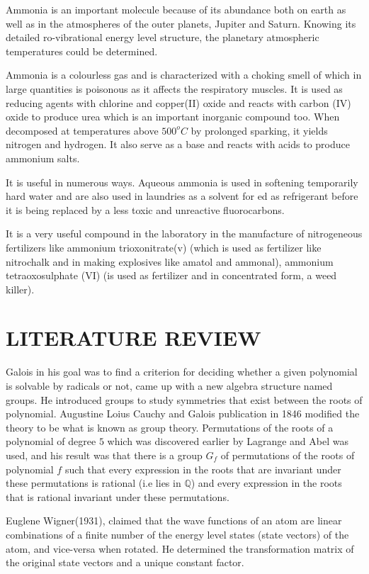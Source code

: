 \documentclass[a4paper, 12pt, openany]{report}
\begin{document}
	Ammonia is an important molecule because of its abundance both on earth as well as in the atmospheres of the outer planets, Jupiter and Saturn. Knowing its detailed ro-vibrational energy level structure, the  planetary  atmospheric temperatures could be determined.
	
	Ammonia is a colourless gas and is characterized with a choking smell of which in large quantities is poisonous as it affects the respiratory muscles. It is used as reducing agents with chlorine and copper(II) oxide and reacts with   carbon (IV) oxide to produce urea which is an important inorganic compound too. When decomposed at temperatures above $500^oC$  by prolonged sparking, it yields nitrogen and hydrogen. It also serve as a base and reacts with acids to produce ammonium salts.
	
	It is useful in numerous ways. Aqueous ammonia is used in softening temporarily hard water and are also used in laundries as a solvent for ed as refrigerant before it is being replaced by a less toxic and unreactive fluorocarbons.
	
	It is a very useful compound in the laboratory in the  manufacture of nitrogeneous fertilizers like ammonium trioxonitrate(v) (which is used as  fertilizer like nitrochalk and in making explosives like amatol and ammonal), ammonium tetraoxosulphate (VI) (is used as fertilizer and in concentrated form, a weed killer).
	
	\chapter{LITERATURE REVIEW} 
	 Galois in his goal was to find a criterion for deciding whether a given \break polynomial is solvable by radicals or not, came up with a new algebra \break structure named groups. He introduced groups to study symmetries that \break exist between the roots of polynomial. Augustine Loius Cauchy and \break Galois publication in 1846 modified the theory to be what is known as group theory. Permutations of the roots of a polynomial of degree $5$ which was \break discovered earlier by Lagrange and Abel was used, and his result was that there is a group $G_f$ of permutations of the roots of polynomial $f$ such that every expression in the roots that are invariant under these permutations is \break rational (i.e lies in $\mathbb{Q}$) and every expression in the roots that is rational invariant under these permutations. 
	
	Euglene Wigner(1931), claimed that the wave functions of an atom are linear combinations of a finite number of the energy level states (state vectors) of the atom, and vice-versa when rotated. He determined the transformation matrix of the original state vectors and a unique constant factor.
	
\end{document}
